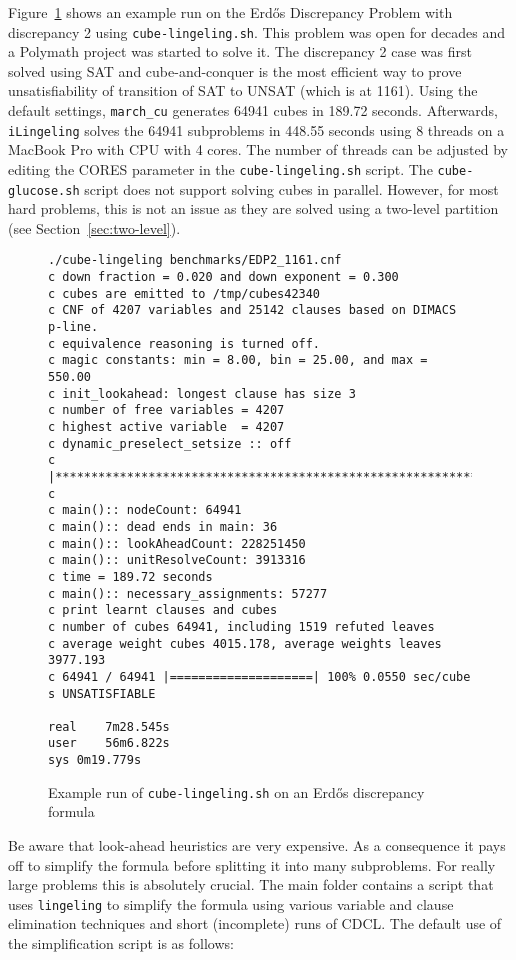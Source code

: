 \documentclass{llncs}
\begin{document}
Figure~\ref{fig:EDP} shows an example run on the Erd\H{o}s Discrepancy Problem with 
discrepancy 2 using {\tt cube-lingeling.sh}. This problem was open for 
decades and a Polymath project was started to solve it. The 
discrepancy 2 case was first solved using SAT and cube-and-conquer
is the most efficient way to prove unsatisfiability of transition of SAT
to UNSAT (which is at 1161). Using the default settings, {\tt march\_cu}
generates 64941 cubes in 189.72 seconds. Afterwards,  {\tt iLingeling}
solves the 64941 subproblems in 448.55 seconds using 8 threads
on a MacBook Pro with CPU with 4 cores. The number of threads can
be adjusted by editing the CORES parameter in the {\tt cube-lingeling.sh} script.
The {\tt cube-glucose.sh} script does not support solving cubes in parallel.
However, for most hard problems, this is not an issue as they are solved 
using a two-level partition (see Section~\ref{sec:two-level}).

\begin{figure}[h]
\centering
\begin{verbatim}
./cube-lingeling benchmarks/EDP2_1161.cnf
c down fraction = 0.020 and down exponent = 0.300
c cubes are emitted to /tmp/cubes42340
c CNF of 4207 variables and 25142 clauses based on DIMACS p-line.
c equivalence reasoning is turned off.
c magic constants: min = 8.00, bin = 25.00, and max = 550.00
c init_lookahead: longest clause has size 3
c number of free variables = 4207
c highest active variable  = 4207
c dynamic_preselect_setsize :: off
c |****************************************************************.|
c
c main():: nodeCount: 64941
c main():: dead ends in main: 36
c main():: lookAheadCount: 228251450
c main():: unitResolveCount: 3913316
c time = 189.72 seconds
c main():: necessary_assignments: 57277
c print learnt clauses and cubes
c number of cubes 64941, including 1519 refuted leaves
c average weight cubes 4015.178, average weights leaves 3977.193
c 64941 / 64941 |====================| 100% 0.0550 sec/cube 
s UNSATISFIABLE

real	7m28.545s
user	56m6.822s
sys	0m19.779s
\end{verbatim}
\caption{Example run of {\tt cube-lingeling.sh} on an Erd\H{o}s discrepancy formula}
\label{fig:EDP}
\end{figure}

Be aware that look-ahead heuristics are very expensive. As a consequence it pays off 
to simplify the formula before splitting it into many subproblems. For 
really large problems this is absolutely crucial. The main folder contains
a script that uses {\tt lingeling} to simplify the formula using various 
variable and clause elimination techniques and short (incomplete) runs of CDCL. 
The default use of the simplification script is as follows:
\end{document}
